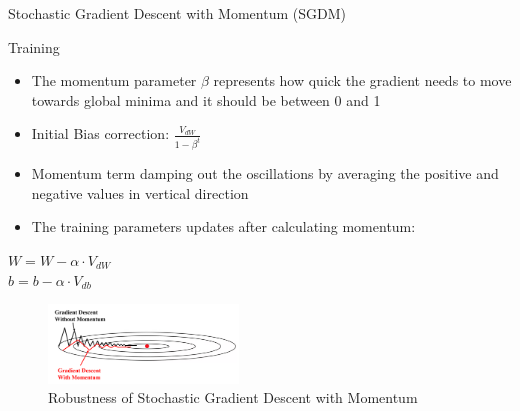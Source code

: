 \documentclass[10pt]{beamer}
\begin{document}
\begin{frame}{Stochastic Gradient Descent with Momentum (SGDM)}
    \begin{block}{Training}
         \begin{itemize}
             \item The momentum parameter $\beta$ represents how quick the gradient needs to move towards global minima and it should be between 0 and 1 
             \item Initial Bias correction: $\frac{V_{d W}}{1 - \beta^t}$
             \item Momentum term damping out the oscillations by averaging the positive and negative values in vertical direction 
             \item The training parameters updates after calculating momentum:  
         \end{itemize}
         \centering
         $W=W-\alpha \cdot V_{d W}$ \\
         $b=b-\alpha \cdot V_{d b}$  
         
        \begin{figure}
            \centering
            \includegraphics[width=0.45\textwidth]{Images/SGDM.png}
            \caption{Robustness of Stochastic Gradient Descent with Momentum}
        \end{figure}   
    \end{block}
\end{frame}
\end{document}
